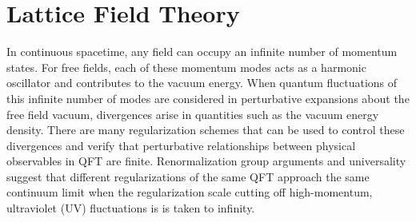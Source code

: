 \section{Lattice Field Theory}\label{sec:lattice}


In continuous spacetime, any field can occupy an infinite number of momentum states. 
For free fields, each of these momentum modes acts as a harmonic oscillator and contributes to the vacuum energy. 
When quantum fluctuations of this infinite number of modes are considered in perturbative expansions about the free field vacuum,
divergences arise in quantities such as the vacuum energy density.
There are many regularization schemes that can be used to control these divergences and verify that perturbative relationships between physical observables in QFT are finite.
Renormalization group arguments and universality suggest that different regularizations of the same QFT approach the same continuum limit when the regularization scale cutting off high-momentum, ultraviolet (UV) fluctuations is is taken to infinity.

